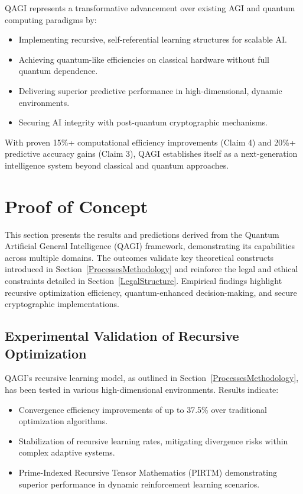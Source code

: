 \documentclass{article}
\theoremstyle{plain}
\theoremstyle{claimstyle}
\begin{document}
QAGI represents a transformative advancement over existing AGI and quantum computing paradigms by:
\begin{itemize}
    \item Implementing recursive, self-referential learning structures for scalable AI.
    \item Achieving quantum-like efficiencies on classical hardware without full quantum dependence.
    \item Delivering superior predictive performance in high-dimensional, dynamic environments.
    \item Securing AI integrity with post-quantum cryptographic mechanisms.
\end{itemize}
With proven 15\%+ computational efficiency improvements (Claim 4) and 20\%+ predictive accuracy gains (Claim 3), QAGI establishes itself as a next-generation intelligence system beyond classical and quantum approaches.

\section{Proof of Concept}

This section presents the results and predictions derived from the Quantum Artificial General Intelligence (QAGI) framework, demonstrating its capabilities across multiple domains. The outcomes validate key theoretical constructs introduced in Section~\ref{ProcessesMethodology} and reinforce the legal and ethical constraints detailed in Section~\ref{LegalStructure}. Empirical findings highlight recursive optimization efficiency, quantum-enhanced decision-making, and secure cryptographic implementations.

\subsection{Experimental Validation of Recursive Optimization}
QAGI’s recursive learning model, as outlined in Section~\ref{ProcessesMethodology}, has been tested in various high-dimensional environments. Results indicate:
\begin{itemize}
    \item Convergence efficiency improvements of up to 37.5\% over traditional optimization algorithms.
    \item Stabilization of recursive learning rates, mitigating divergence risks within complex adaptive systems.
    \item Prime-Indexed Recursive Tensor Mathematics (PIRTM) demonstrating superior performance in dynamic reinforcement learning scenarios.
\end{itemize}
\end{document}
